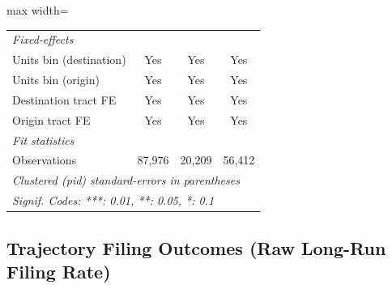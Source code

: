 \documentclass[
  11pt,
]{article}
\begin{document}
\begin{table}[htbp]
\begin{adjustbox}{max width=\textwidth}
\begin{tabular}{lccc}
      \midrule
      \emph{Fixed-effects}\\
      Units bin (destination)                 & Yes            & Yes             & Yes\\  
      Units bin (origin)                      & Yes            & Yes             & Yes\\  
      Destination tract FE                    & Yes            & Yes             & Yes\\  
      Origin tract FE                         & Yes            & Yes             & Yes\\  
      \midrule
      \emph{Fit statistics}\\
      Observations                            & 87,976         & 20,209          & 56,412\\  
      \midrule \midrule
      \multicolumn{4}{l}{\emph{Clustered (pid) standard-errors in parentheses}}\\
      \multicolumn{4}{l}{\emph{Signif. Codes: ***: 0.01, **: 0.05, *: 0.1}}\\
   \end{tabular}

\end{adjustbox}
\end{table}

\subsection{Trajectory Filing Outcomes (Raw Long-Run Filing
Rate)}\label{trajectory-filing-outcomes-raw-long-run-filing-rate}
\end{document}
